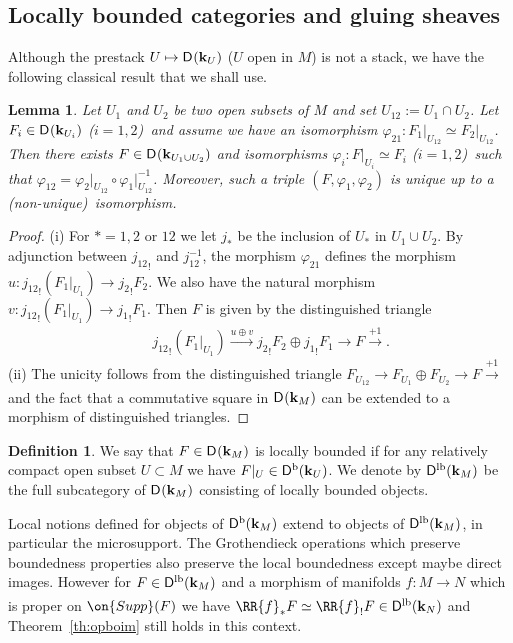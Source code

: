 \documentclass[12pt,leqno]{article}
\newtheorem{lemma}[theorem]{Lemma}
\theoremstyle{definition}
\newtheorem{definition}[theorem]{Definition}
\def\phi{{\varphi}}
\newcommand{\cor}{{\bf k}}
\renewcommand{\to}[1][]{\xrightarrow[]{#1}}
\newcommand{\eim}[1]{{#1}_!}
\newcommand{\roim}[1]{\RR{#1}_*}
\newcommand{\reim}[1]{\RR{#1}_!}
\newcommand{\opb}[1]{#1^{-1}}
\newcommand{\eqdot}{\mathbin{:=}}
\newcommand{\cl}{\colon}
\newcommand{\lp}{{\rm(}}
\newcommand{\rp}{{\rm)}}
\newcommand{\eqn}{\begin{eqnarray*}}
\newcommand{\eneqn}{\end{eqnarray*}}
\newcommand{\Supp}{\on{Supp}}
\newcommand{\Der}[1][]{\mathsf{D}^{#1}}
\newcommand{\Derb}{\Der[\mathrm{b}]}
\newcommand{\Derlb}{\Der[\mathrm{lb}]}
\numberwithin{equation}{section}
\begin{document}
\subsection{Locally bounded categories and gluing sheaves}
Although the prestack $U\mapsto\Der(\cor_U)$ ($U$ open in $M$) is not a
stack, we have the following classical result that we shall use.
\begin{lemma}\label{le:stack1}
Let $U_1$ and $U_2$ be two open subsets of $M$ and set
$U_{12}\eqdot U_1\cap U_2$.  Let $F_i\in\Der(\cor_{U_i})$ \lp$i=1,2$\rp\, and
assume we have an isomorphism
$\phi_{21}\cl F_1\vert_{U_{12}}\simeq F_2\vert_{U_{12}}$.  Then there exists
$F\in\Der(\cor_{U_1\cup U_2})$ and isomorphisms
$\phi_{i}\cl F\vert_{U_{i}}\simeq F_i$ \lp$i=1,2$\rp\, such that
$\phi_{12}=\phi_2\vert_{U_{12}}\circ\opb{\phi_1\vert_{U_{12}}}$.  Moreover,
such a triple $(F,\phi_1,\phi_2)$ is unique up to 
a \lp non-unique\rp\, isomorphism.
\end{lemma}
\begin{proof}
(i) For $* = 1,2$ or $12$ we let $j_*$ be the inclusion of $U_*$ in $U_1\cup U_2$.
By adjunction between $\eim{j_{12}}$ and $\opb{j_{12}}$, the morphism
$\phi_{21}$ defines the morphism $u\cl \eim{j_{12}} (F_1|_{U_1}) \to \eim{j_2}F_2$.
We also have the natural morphism
$v \cl \eim{j_{12}} (F_1|_{U_1}) \to \eim{j_1}F_1$.
Then $F$ is given by the distinguished triangle
\eqn
&&\eim{j_{12}}(F_1|_{U_1})\to[u\oplus v]\eim{j_2}F_2\oplus\eim{j_1}F_1\to F \to[+1].
\eneqn
\medskip\noindent
(ii) The unicity follows from the distinguished triangle
$F_{U_{12}} \to F_{U_1} \oplus F_{U_2} \to F \to[+1]$ and the fact that a
commutative square in $\Der(\cor_M)$ 
can be extended to a morphism of distinguished triangles.
\end{proof}

\begin{definition}\label{def:locbnd}
We say that $F\in \Der(\cor_M)$ is locally bounded if for any relatively
compact open subset $U\subset M$ we have $F|_U \in \Derb(\cor_U)$.  We denote
by $\Derlb(\cor_M)$ be the full subcategory of $\Der(\cor_M)$ consisting of
locally bounded objects.
\end{definition}
Local notions defined for objects of $\Derb(\cor_M)$ extend to objects of
$\Derlb(\cor_M)$, in particular the microsupport. The Grothendieck operations
which preserve boundedness properties also preserve the local boundedness
except maybe direct images.
However for $F\in \Derlb(\cor_M)$ and a morphism of manifolds $f\cl M\to N$
which is proper on $\Supp(F)$ we have
$\roim{f}F \simeq \reim{f}F \in \Derlb(\cor_N)$
and Theorem~\ref{th:opboim} still holds in this context.
\end{document}
